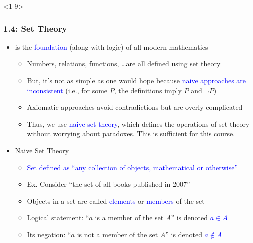 \documentclass[10pt,english,aspectratio=169]{beamer}
\begin{document}
\begin{frame}<1-9> \frametitle{1.4: Set Theory}

\begin{itemize}
\setlength\itemsep{3mm}
\item<1-> is the \textcolor{blue}{foundation} (along with logic) of all modern mathematics \vspace{1mm}
\begin{itemize} 
  \setlength\itemsep{1.5mm}
  \item<2-> Numbers, relations, functions, \ldots are all defined using set theory
  \item<3-> But, it's not as simple as one would hope because \textcolor{blue}{naive approaches are inconsistent} (i.e., for some $P$, the definitions imply $P$ and $\neg P$)
  \item<4-> Axiomatic approaches avoid contradictions but are overly complicated
  \item<5-> Thus, we use \textcolor{blue}{naive set theory}, which defines the operations of set theory without worrying about paradoxes. This is sufficient for this course.
\end{itemize}

\item<6-> Naive Set Theory \vspace{1mm}
\begin{itemize} 
  \setlength\itemsep{1.5mm}
  \item<6-> \textcolor{blue}{Set defined as ``any collection of objects, mathematical or otherwise''}
  \item<6-> Ex. Consider ``the set of all books published in 2007''
  \item<7-> Objects in a set are called \textcolor{blue}{elements} or \textcolor{blue}{members} of the set
  \item<8-> Logical statement: ``$a$ is a member of the set $A$'' is denoted \textcolor{blue}{$a \in A$}
  \item<9-> Its negation: ``$a$ is not a member of the set $A$'' is denoted \textcolor{blue}{$a \notin A$}
\end{itemize}
\end{itemize}


\end{frame}
\end{document}
